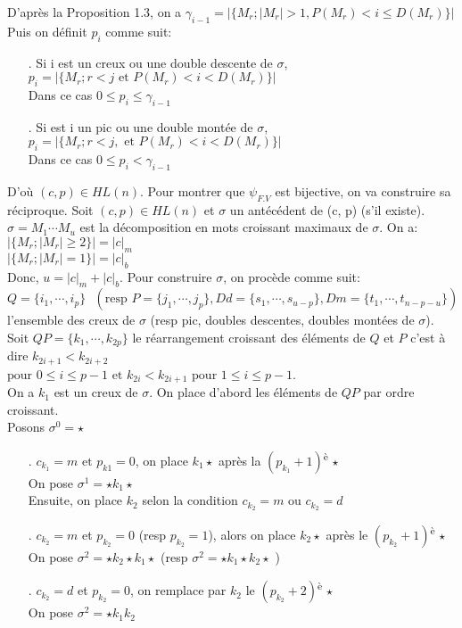 			D'après la Proposition 1.3, on a $\gamma_{i-1}=|\{ M_{r};|M_{r}|>1,P(M_{r})<i\leq D(M_{r}) \}|$\\
			Puis on définit $p_{i}$ comme suit:
			\begin{itemize}
				\item[.] Si  i est un creux ou une double descente de $\sigma$, $p_{i}=|\{ M_{r};r<j \text{ et }P(M_{r})<i<D(M_{r}) \}|$\\Dans ce cas $0\leq p_{i}\leq\gamma_{i-1}$
				\item[.] Si est i un pic ou une double montée de $\sigma$,$p_{i}=|\{ M_{r};r<j,\text{ et }P(M_{r})<i<D(M_{r}) \}|$\\Dans ce cas $0\leq p_{i} <\gamma_{i-1}$	
			\end{itemize}
			D'où $(c,p)\in HL(n)$.
			Pour montrer que $\psi_{F.V}$ est bijective, on va construire sa réciproque. Soit $(c, p) \in HL(n) $ et $\sigma$ un antécédent de (c, p) (s'il existe).\\
			$\sigma = M_{1}\cdots M_{u} $ est la décomposition en mots croissant maximaux de $\sigma$. On a:\\
			$|\{M_{r};|M_{r}| \geq 2 \}| = |c|_{m}$\\
			$|\{M_{r};|M_{r}| = 1 \}| = |c|_{b}$\\
			Donc, $u = |c|_{m}+|c|_{b}$. Pour construire $\sigma$, on procède comme suit:\\
			$ Q = \{ i_{1}, \cdots, i_{p} \} \text{ } (\text{resp } P = \{ j_{1}, \cdots, j_{p} \},
			Dd = \{ s_{1}, \cdots, s_{u-p} \}, Dm = \{ t_{1}, \cdots, t_{n-p-u} \})$ l'ensemble des creux de $\sigma$ (resp pic, doubles descentes, doubles montées de $\sigma$). Soit $QP = \{ k_{1}, \cdots, k_{2p} \} $ le réarrangement croissant des éléments de $Q$ et $P$ c'est à dire $k_{2i+1}<k_{2i+2}$\\$\text{pour } 0 \leq i \leq p-1 \text{ et } k_{2i} < k_{2i+1} \text{ pour } 1 \leq i \leq p-1 $. \\
			On a $k_{1}$ est un creux de $\sigma$. On place d'abord les éléments de $QP$ par ordre croissant.\\
			Posons $\sigma^{0} = \star $
			\begin{itemize}
			\item[.]$c_{k_{1}}=m \text{ et } p_{k{1}}=0$, on place $k_{1}\star$ après la $(p_{k_{1}}+1)$\textsuperscript{è} $\star$\\
			On pose $\sigma^{1} = \star k_{1} \star $\\
			Ensuite, on place $k_{2}$ selon la condition $c_{k_{2}}=m$ ou $c_{k_{2}}=d$\\
			\item[.]$c_{k_{2}}=m$ et $ p_{k_{2}}=0$ (resp $p_{k_{2}}=1$), alors on place $k_{2}\star$ après le $(p_{k_{2}}+1)$\textsuperscript{è} $\star$\\
			On pose $\sigma^{2} = \star k_{2} \star k_{1} \star $ (resp $\sigma^{2} = \star k_{1} \star k_{2} \star $ )\\
			\item[.]$c_{k_{2}}=d$ et $ p_{k_{2}}=0$, on remplace par $k_{2}$ le $(p_{k_{2}}+2)$\textsuperscript{è} $\star$\\
			On pose $\sigma^{2} = \star k_{1} k_{2} $
			\end{itemize}
